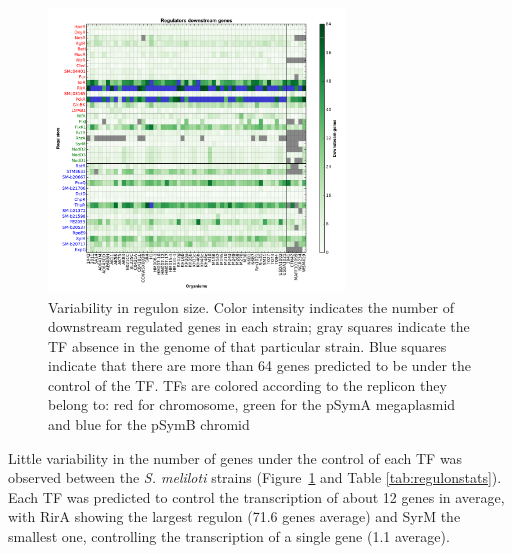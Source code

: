 \begin{figure}[!tb]
	\centering
	\includegraphics[width=0.7\textwidth]{./figures/Appendix_1/2_reg}
  	\caption{\label{fig:reg2} Variability in regulon size. Color intensity indicates the number of downstream regulated genes in each strain; gray squares indicate the TF absence in the genome of that particular strain. Blue squares indicate that there are more than 64 genes predicted to be under the control of the TF. TFs are colored according to the replicon they belong to: red for chromosome, green for the pSymA megaplasmid and blue for the pSymB chromid}
\end{figure}%
Little variability in the number of genes under the control of each TF was observed between the \textit{S. meliloti} strains (Figure~\ref{fig:reg2} and Table \ref{tab:regulonstats}).\\
Each TF was predicted to control the transcription of about 12 genes in average, with RirA showing the largest regulon (71.6 genes average) and SyrM the smallest one, controlling the transcription of a single gene (1.1 average).\\
